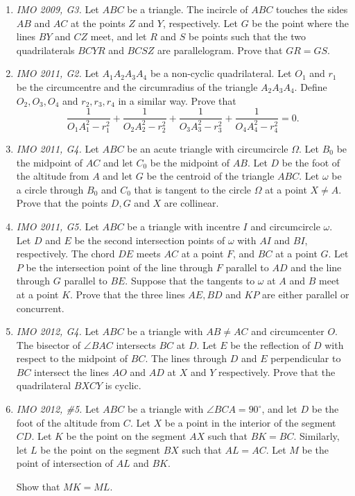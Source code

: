 \documentclass[11pt,a4paper]{article}
\begin{document}
\begin{enumerate}
\item\emph {IMO 2009, G3.} Let $ABC$ be a triangle. The incircle of $ABC$ touches the sides $AB$ and $AC$ at the points $Z$ and $Y$, respectively. Let $G$ be the point where the lines $BY$ and $CZ$ meet, and let $R$ and $S$ be points such that the two quadrilaterals $BCYR$ and $BCSZ$ are parallelogram.
Prove that $GR=GS$.

\item\emph {IMO 2011, G2.} Let $A_1A_2A_3A_4$ be a non-cyclic quadrilateral. Let $O_1$ and $r_1$ be the circumcentre and the circumradius of the triangle $A_2A_3A_4$. Define $O_2,O_3,O_4$ and $r_2,r_3,r_4$ in a similar way. Prove that
\[\frac{1}{O_1A_1^2-r_1^2}+\frac{1}{O_2A_2^2-r_2^2}+\frac{1}{O_3A_3^2-r_3^2}+\frac{1}{O_4A_4^2-r_4^2}=0.\]

\item\emph {IMO 2011, G4.} Let $ABC$ be an acute triangle with circumcircle $\Omega$. Let $B_0$ be the midpoint of $AC$ and let $C_0$ be the midpoint of $AB$. Let $D$ be the foot of the altitude from $A$ and let $G$ be the centroid of the triangle $ABC$. Let $\omega$ be a circle through $B_0$ and $C_0$ that is tangent to the circle $\Omega$ at a point $X\not= A$. Prove that the points $D,G$ and $X$ are collinear.

\item\emph {IMO 2011, G5.} Let $ABC$ be a triangle with incentre $I$ and circumcircle $\omega$. Let $D$ and $E$ be the second intersection points of $\omega$ with $AI$ and $BI$, respectively. The chord $DE$ meets $AC$ at a point $F$, and $BC$ at a point $G$. Let $P$ be the intersection point of the line through $F$ parallel to $AD$ and the line through $G$ parallel to $BE$. Suppose that the tangents to $\omega$ at $A$ and $B$ meet at a point $K$. Prove that the three lines $AE,BD$ and $KP$ are either parallel or concurrent.

\item\emph {IMO 2012, G4.} Let $ABC$ be a triangle with $AB \neq AC$ and circumcenter $O$. The bisector of $\angle BAC$ intersects $BC$ at $D$. Let $E$ be the reflection of $D$ with respect to the midpoint of $BC$. The lines through $D$ and $E$ perpendicular to $BC$ intersect the lines $AO$ and $AD$ at $X$ and $Y$ respectively. Prove that the quadrilateral $BXCY$ is cyclic.

\item\emph {IMO 2012, \#5.} Let $ABC$ be a triangle with $\angle BCA=90^{\circ}$, and let $D$ be the foot of the altitude from $C$. Let $X$ be a point in the interior of the segment $CD$. Let $K$ be the point on the segment $AX$ such that $BK=BC$. Similarly, let $L$ be the point on the segment $BX$ such that $AL=AC$. Let $M$ be the point of intersection of $AL$ and $BK$.

Show that $MK=ML$.

\end{enumerate}
\end{document}
